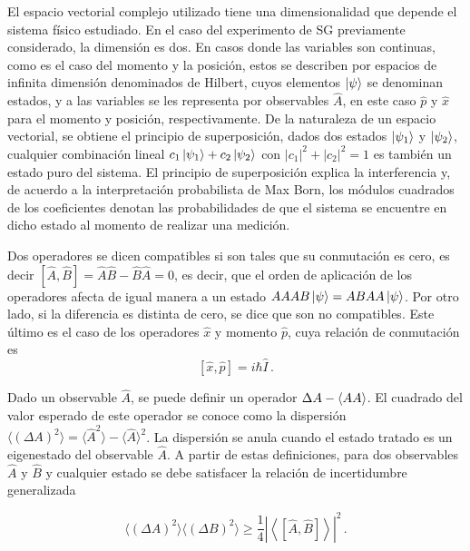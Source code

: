 
El espacio vectorial complejo utilizado tiene una dimensionalidad que depende el sistema físico estudiado. En el caso del experimento de SG previamente considerado, la dimensión es dos. En casos donde las variables son continuas, como es el caso del momento y la posición, estos se describen por espacios de infinita dimensión denominados de Hilbert, cuyos elementos $\ket{\psi}$ se denominan estados, y a las variables se les representa por observables $\hat{A}$, en este caso $\hat{p}$ y $\hat{x}$ para el momento y posición, respectivamente. De la naturaleza de un espacio vectorial, se obtiene el principio de superposición, dados dos estados $\ket{\psi_1}$ y $\ket{\psi_2}$, cualquier combinación lineal $c_1 \ket{\psi_1} + c_2 \ket{\psi_2}$ con $|c_1|^2 + |c_2|^2 = 1$ es también un estado puro del sistema. El principio de superposición explica la interferencia y, de acuerdo a la interpretación probabilista de Max Born, los módulos cuadrados de los coeficientes denotan las probabilidades de que el sistema se encuentre en dicho estado al momento de realizar una medición.

Dos operadores se dicen compatibles si son tales que su conmutación es cero, es decir $[\hat{A}, \hat{B}] = \hat{A}\hat{B} - \hat{B}\hat{A} = 0$, es decir, que el orden de aplicación de los operadores afecta de igual manera a un estado $\hat{A} \hat{B} \ket{\psi} = \hat{B} \hat{A} \ket{\psi}$. Por otro lado, si la diferencia es distinta de cero, se dice que son no compatibles. Este último es el caso de los operadores $\hat{x}$ y momento $\hat{p}$, cuya relación de conmutación es
\begin{equation}
  \label{1.3}
  [\hat{x}, \hat{p}] = i\hbar \hat{I}\,.
\end{equation}

Dado un observable $\hat{A}$, se puede definir un operador $\Delta A \def \hat{A} - \langle \hat{A} \rangle$. El cuadrado del valor esperado de este operador se conoce como la dispersión $\langle (\Delta A)^2 \rangle = \langle \hat{A}^2\rangle  - \langle\hat{A}\rangle^2$. La dispersión se anula cuando el estado tratado es un eigenestado del observable $\hat{A}$. A partir de estas definiciones, para dos observables $\hat{A}$ y $\hat{B}$ y cualquier estado se debe satisfacer la relación de incertidumbre generalizada \cite{Sakurai}

\begin{equation}
  \label{1.4}
  \langle (\Delta A)^2 \rangle \langle (\Delta B)^2 \rangle \geq \frac{1}{4} \left| \left\langle \left[ \hat{A}, \hat{B} \right] \right\rangle  \right|^2 \,.
\end{equation}

